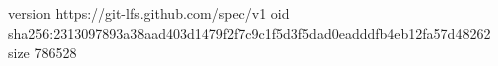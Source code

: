 version https://git-lfs.github.com/spec/v1
oid sha256:2313097893a38aad403d1479f2f7c9c1f5d3f5dad0eadddfb4eb12fa57d48262
size 786528
